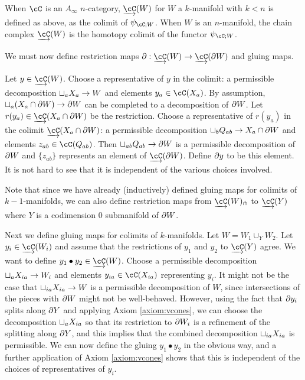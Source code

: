 \begin{defn}
When $\cC$ is an $A_\infty$ $n$-category, $\cl{\cC}(W)$ for $W$ a $k$-manifold with $k < n$ 
is defined as above, as the colimit of $\psi_{\cC;W}$.
When $W$ is an $n$-manifold, the chain complex $\cl{\cC}(W)$ is the homotopy colimit of the functor $\psi_{\cC;W}$.
\end{defn}


\medskip

We must now define restriction maps $\bd : \cl{\cC}(W) \to \cl{\cC}(\bd W)$ and gluing maps.

Let $y\in \cl{\cC}(W)$.
Choose a representative of $y$ in the colimit: a permissible decomposition $\sqcup_a X_a \to W$ and elements
$y_a \in \cC(X_a)$.
By assumption, $\sqcup_a (X_a \cap \partial W) \to \partial W$ can be completed to a decomposition of $\partial W$.
Let $r(y_a) \in \cl\cC(X_a \cap \bd W)$ be the restriction.
Choose a representative of $r(y_a)$ in the colimit $\cl\cC(X_a \cap \bd W)$: a permissible decomposition
$\sqcup_b Q_{ab} \to X_a \cap \partial W$ and elements $z_{ab} \in \cC(Q_{ab})$.
Then $\sqcup_{ab} Q_{ab} \to \partial W$ is a permissible decomposition of $\partial W$ and $\{z_{ab}\}$ represents
an element of $\cl{\cC}(\bd W)$.  Define $\partial y$ to be this element.
It is not hard to see that it is independent of the various choices involved.

Note that since we have already (inductively) defined gluing maps for colimits of $k{-}1$-manifolds,
we can also define restriction maps from $\cl{\cC}(W)\trans{}$ to $\cl{\cC}(Y)$ where $Y$ is a codimension 0 
submanifold of $\partial W$.

Next we define gluing maps for colimits of $k$-manifolds.
Let $W = W_1 \cup_Y W_2$.
Let $y_i \in \cl\cC(W_i)$ and assume that the restrictions of $y_1$ and $y_2$ to $\cl\cC(Y)$ agree.
We want to define $y_1\bullet y_2 \in \cl\cC(W)$.
Choose a permissible decomposition $\sqcup_a X_{ia} \to W_i$ and elements 
$y_{ia} \in \cC(X_{ia})$ representing $y_i$.
It might not be the case that $\sqcup_{ia} X_{ia} \to W$ is a permissible decomposition of $W$,
since intersections of the pieces with $\partial W$ might not be well-behaved.
However, using the fact that $\partial y_i$ splits along $\partial Y$ and applying Axiom \ref{axiom:vcones},
we can choose the decomposition $\sqcup_{a} X_{ia}$ so that its restriction to $\partial W_i$ is a refinement
of the splitting along $\partial Y$, and this implies that the combined decomposition $\sqcup_{ia} X_{ia}$
is permissible.
We can now define the gluing $y_1\bullet y_2$ in the obvious way, and a further application of Axiom \ref{axiom:vcones}
shows that this is independent of the choices of representatives of $y_i$.


